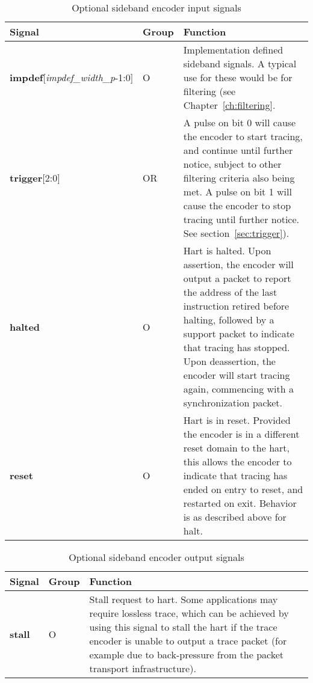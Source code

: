 \begin{table}[htp]
    \centering
    \caption{Optional sideband encoder input signals}
    \label{tab:ingress-side-band}
    \begin{tabulary}{\textwidth}{|l|l|p{90mm}|}
        \hline
        \textbf{Signal} & \textbf{Group} & \textbf{Function} \\
        \hline
        \textbf{impdef}[\textit{impdef\_width\_p}-1:0] & O &  Implementation defined sideband signals.  A typical use for
        these would be for filtering (see Chapter~\ref{ch:filtering}.\\
        \hline
        \textbf{trigger}[2:0] & OR & A pulse on bit 0 will cause the encoder to start tracing, and continue until further 
        notice, subject to other filtering criteria also being met.\newline
        A pulse on bit 1 will cause the encoder to stop tracing until further notice.  See section~\ref{sec:trigger}).\\
        \hline
        \textbf{halted} & O & Hart is halted.  Upon assertion, the encoder will output a packet to report the address 
        of the last instruction retired before halting, followed by a support packet to indicate that tracing has stopped. 
        Upon deassertion, the encoder will start tracing again, commencing with a synchronization packet.\\
        \hline
        \textbf{reset} & O & Hart is in reset.  Provided the encoder is in a different reset domain to the hart, this
        allows the encoder to indicate that tracing has ended on entry to reset, and restarted on exit.  
        Behavior is as described above for halt.\\
        \hline
    \end{tabulary}
\end{table}

\begin{table}[htp]
    \centering
    \caption{Optional sideband encoder output signals}
    \label{tab:egress-side-band}
    \begin{tabulary}{\textwidth}{|l|l|p{130mm}|}
        \hline
        \textbf{Signal} & \textbf{Group} & \textbf{Function} \\
        \hline
        \textbf{stall} & O & Stall request to hart.  Some applications may require lossless trace, which can be achieved by
        using this signal to stall the hart if the trace encoder is unable to output a trace packet (for example due to 
        back-pressure from the packet transport infrastructure).\\
        \hline
    \end{tabulary}
\end{table}


